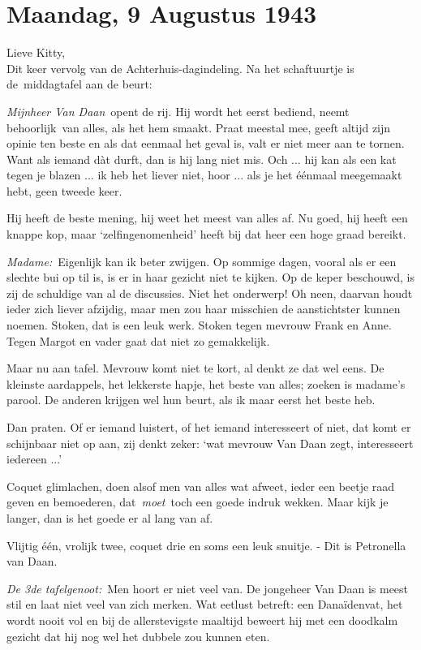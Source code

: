 \documentclass{book}
\begin{document}
\section*{Maandag, 9 Augustus 1943}

Lieve Kitty,\\
Dit keer vervolg van de Achterhuis-dagindeling. Na het
schaftuurtje is de~middagtafel aan de beurt:

\emph{Mijnheer Van Daan}~opent de rij. Hij wordt het eerst bediend, neemt
behoorlijk~van alles, als het hem smaakt. Praat meestal mee, geeft altijd zijn
opinie ten beste en als dat eenmaal het geval is, valt er niet meer aan te
tornen. Want als iemand dàt durft, dan is hij lang niet mis. Och ... hij kan als
een kat tegen je blazen ... ik heb het liever niet, hoor ... als je het éénmaal
meegemaakt hebt, geen tweede keer.

Hij heeft de beste mening, hij weet het meest van alles af. Nu goed, hij heeft
een knappe kop, maar `zelfingenomenheid' heeft bij dat heer een hoge graad
bereikt.

\emph{Madame:}~Eigenlijk kan ik beter zwijgen. Op sommige dagen, vooral als er
een slechte bui op til is, is er in haar gezicht niet te kijken.  Op de keper
beschouwd, is zij de schuldige van al de discussies. Niet het onderwerp! Oh
neen, daarvan houdt ieder zich liever afzijdig, maar men zou haar misschien de
aanstichtster kunnen noemen. Stoken, dat is een leuk werk. Stoken tegen mevrouw
Frank en Anne. Tegen Margot en vader gaat dat niet zo gemakkelijk.

Maar nu aan tafel. Mevrouw komt niet te kort, al denkt ze dat wel eens.  De
kleinste aardappels, het lekkerste hapje, het beste van alles; zoeken is
madame's parool. De anderen krijgen wel hun beurt, als ik maar eerst het beste
heb.

Dan praten. Of er iemand luistert, of het iemand interesseert of niet, dat komt
er schijnbaar niet op aan, zij denkt zeker: `wat mevrouw Van Daan zegt,
interesseert iedereen ...'

Coquet glimlachen, doen alsof men van alles wat afweet, ieder een beetje raad
geven en bemoederen, dat~\emph{moet}~toch een goede indruk wekken.  Maar kijk je
langer, dan is het goede er al lang van af.

Vlijtig één, vrolijk twee, coquet drie en soms een leuk snuitje. - Dit is
Petronella van Daan.

\emph{De 3de tafelgenoot:}~Men hoort er niet veel van. De jongeheer Van Daan is
meest stil en laat niet veel van zich merken. Wat eetlust betreft: een
Danaïdenvat, het wordt nooit vol en bij de allerstevigste maaltijd beweert hij
met een doodkalm gezicht dat hij nog wel het dubbele zou kunnen eten.
\end{document}
